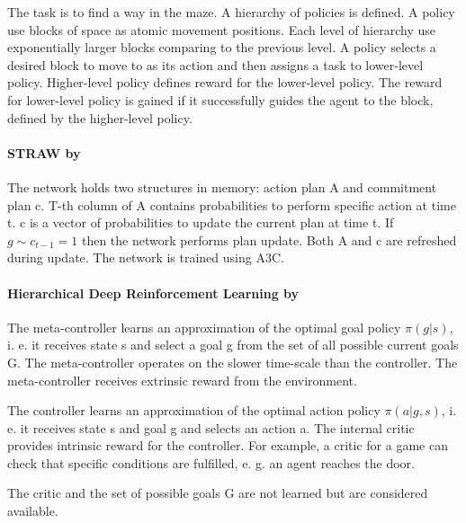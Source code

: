 \documentclass[acmsmall, nonacm]{acmart}
\begin{document}
The task is to find a way in the maze. A hierarchy of policies is defined. A policy use blocks of space as atomic movement positions. Each level of hierarchy use exponentially larger blocks comparing to the previous level. A policy selects a desired block to move to as its action and then assigns a task to lower-level policy. Higher-level policy defines reward for the lower-level policy. The reward for lower-level policy is gained if it successfully guides the agent to the block, defined by the higher-level policy.


\paragraph{STRAW by~\citet{Vezhnevets2016StrategicAW}} %
\label{par:straw}

The network holds two structures in memory: action plan A and commitment plan c. T-th column of A contains probabilities to perform specific action at time t. c is a vector of probabilities to update the current plan at time t. If $g \sim c_{t-1} = 1$ then the network performs plan update. Both A and c are refreshed during update. The network is trained using A3C.


\paragraph{Hierarchical Deep Reinforcement Learning by~\citet{Kulkarni2016HierarchicalDR}} %
\label{par:hierarchical_deep_rl}

The meta-controller learns an approximation of the optimal goal policy $\pi(g|s)$, i. e. it receives state s and select a goal g from the set of all possible current goals G. The meta-controller operates on the slower time-scale than the controller. The meta-controller receives extrinsic reward from the environment.

The controller learns an approximation of the optimal action policy $\pi(a|g,s)$, i. e. it receives state s and goal g and selects an action a. The internal critic provides intrinsic reward for the controller. For example, a critic for a game can check that specific conditions are fulfilled, e. g. an agent reaches the door.

The critic and the set of possible goals G are not learned but are considered available.

\end{document}
